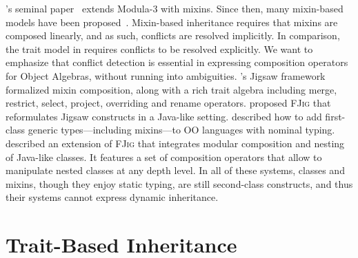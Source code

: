 \citeauthor{bracha1990mixin}'s seminal paper~\citep{bracha1990mixin} extends
Modula-3 with mixins. Since then, many mixin-based models have been
proposed~\citep{flatt1998classes,bono1999core, ancona2003jam}. Mixin-based
inheritance requires that mixins are composed linearly, and as such, conflicts
are resolved implicitly. In comparison, the trait model in \sedel requires
conflicts to be resolved explicitly. We want to emphasize that conflict
detection is essential in expressing composition operators for Object Algebras,
without running into ambiguities. \citeauthor{bracha1992programming}'s Jigsaw
framework~\citep{bracha1992programming} formalized mixin composition, along with
a rich trait algebra including merge, restrict, select, project, overriding and
rename operators. \citet{LAGORIO201286} proposed \textsc{FJig} that reformulates
Jigsaw constructs in a Java-like setting. \citet{DBLP:conf/oopsla/AllenBC03}
described how to add first-class generic types---including mixins---to OO
languages with nominal typing. \citet{Corradi_2012} described an extension of
\textsc{FJig} that integrates modular composition and nesting of Java-like
classes. It features a set of composition operators that allow to manipulate
nested classes at any depth level. In all of these systems, classes and mixins,
though they enjoy static typing, are still second-class constructs, and thus
their systems cannot express dynamic inheritance.


\section{Trait-Based Inheritance}

